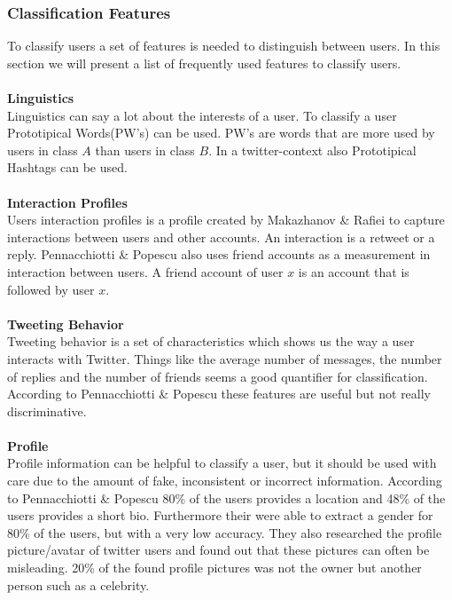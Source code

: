 \documentclass{article}
\begin{document}
\subsubsection{Classification Features}
To classify users a set of features is needed to distinguish between users. In this section we will present a list of frequently used features to classify users.  
\\\\
\textbf{Linguistics}\\
Linguistics can say a lot about the interests of a user. To classify a user Prototipical Words(PW's) can be used.  \cite{userclasst} PW's are words that are more used by users in class $A$ than users in class $B$. In a twitter-context also Prototipical Hashtags can be used.
\\\\
\textbf{Interaction Profiles}\\
Users interaction profiles is a profile created by Makazhanov \& Raﬁei to capture interactions between users and other accounts. \cite{pol} An interaction is a retweet or a reply. Pennacchiotti \& Popescu also uses friend accounts as a measurement in interaction between users. \cite{usermachine}  A friend account of user $x$ is an account that is followed by user $x$.  
\\\\
\textbf{Tweeting Behavior}\\
Tweeting behavior is a set of characteristics which shows us the way a user interacts with Twitter. Things like the average number of messages, the number of replies and the number of friends seems a good quantifier for classification. According to Pennacchiotti \& Popescu these features are useful but not really discriminative. \cite{usermachine}
\\\\
\textbf{Profile}\\
Profile information can be helpful to classify a user, but it should be used with care due to the amount of fake, inconsistent or incorrect information. According to Pennacchiotti \& Popescu  80\% of the users provides a location and 48\% of the users provides a short bio. \cite{usermachine} Furthermore their were able to extract a gender for 80\% of the users, but with a very low accuracy. They also researched the profile picture/avatar of twitter users and found out that these pictures can often be misleading. 20\% of the found profile pictures was not the owner but another person such as a celebrity. \cite{usermachine}
\end{document}
